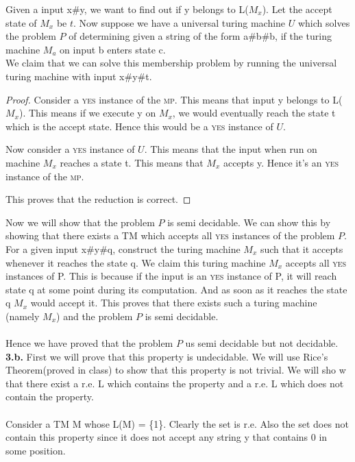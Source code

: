 \documentclass[11pt]{article}
\begin{document}
Given a input x\#y, we want to find out if y belongs to L($M_x$). Let the accept state of $M_x$ be $t$. Now suppose we have a universal turing machine $U$ which solves the problem $P$ of determining given a string of the form a\#b\#b, if the turing machine $M_a$ on input b enters state c. \\We claim that we can solve this membership problem by running the universal turing machine with input  x\#y\#t. 
\begin{proof}
Consider a \textsc{yes} instance of the \textsc{mp}. This means that input y belongs to L($M_x$). This means if we execute y on $M_x$, we would eventually reach the state t which is the accept state. Hence this would be a \textsc{yes} instance of $U$.

Now consider a \textsc{yes} instance of $U$. This means that the input when run on machine $M_x$ reaches a state t. This means that $M_x$ accepts y. Hence it's an \textsc{yes} instance of the \textsc{mp}.

This proves that the reduction is correct.
\end{proof}
Now we will show that the problem $P$ is semi decidable. We can show this by showing that there exists a TM which accepts all \textsc{yes} instances of the problem $P$. For a given input x\#y\#q, construct the turing machine $M_x$ such that it accepts whenever it reaches the state q. We claim this turing machine $M_x$ accepts all \textsc{yes} instances of P. This is because if the input is an \textsc{yes} instance of P, it will reach state q at some point during its computation. And as soon as it reaches the state q $M_x$ would accept it. This proves that there exists such a turing machine (namely $M_x$) and the problem $P$ is semi decidable.\\\\
Hence we have proved that the problem $P$ us semi decidable but not decidable.
\newpage
\textbf{3.b.} First we will prove that this property is undecidable. We will use Rice's Theorem(proved in class) to show that this property is not trivial. We will sho	w that there exist a r.e. L which contains the property and a r.e. L which does not contain the property. \\\\
Consider a TM M whose L(M) = \{1\}. Clearly the set is r.e. Also the set does not contain this property since it does not accept any string y that contains 0 in some position.
\end{document}
